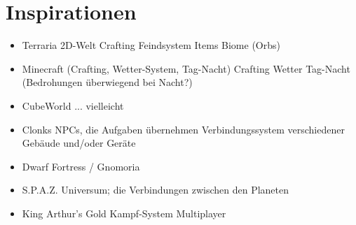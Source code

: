 \section{Inspirationen}
\label{sec:ispirationen}


\begin{itemize}
\item  Terraria
\subitem	2D-Welt
\subitem	Crafting
\subitem	Feindsystem
\subitem	Items
\subitem	Biome (Orbs)
\item  Minecraft (Crafting, Wetter-System, Tag-Nacht)
\subitem	Crafting
\subitem	Wetter
\subitem	Tag-Nacht (Bedrohungen überwiegend bei Nacht?)
\item  CubeWorld ... vielleicht
\item  Clonks
\subitem	NPCs, die Aufgaben übernehmen
\subitem	Verbindungssystem verschiedener Gebäude und/oder Geräte
\item  Dwarf Fortress / Gnomoria
\item  S.P.A.Z.
\subitem	Universum; die Verbindungen zwischen den Planeten
\item  King Arthur's Gold
\subitem	Kampf-System
\subitem	Multiplayer
\end{itemize}